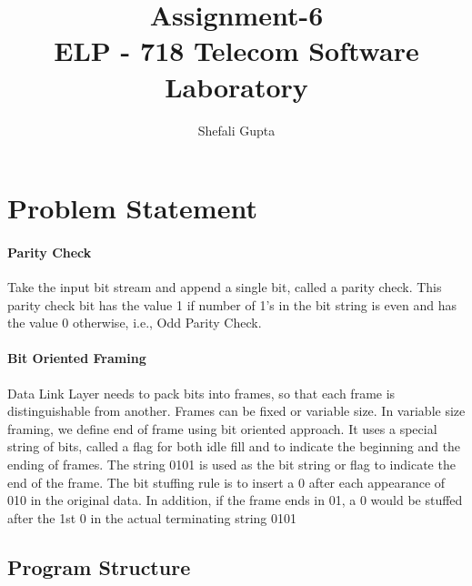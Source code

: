 \documentclass[a4paper,10pt]{report}
\title{\textbf{Assignment-6\\
ELP - 718 Telecom Software Laboratory}}
\author{Shefali Gupta}
\date{\parbox{\linewidth}{\centering%
  \today\endgraf\bigskip
 Entry No. - 2017JTM2767\endgraf\bigskip
  \texttt{[image: /home/shefaligupta/Downloads/iit.png]} \endgraf\bigskip
Bharti School\\
Telecommunication Technology and Management \\ IIT DELHI\\India}}
\begin{document}
\maketitle

\newpage
\tableofcontents
\newpage
{}

\section{Problem Statement}

\paragraph{Parity Check}
Take the input bit stream and append a single bit, called a parity check. This parity check bit has the value 1 if number of 1’s in the bit string is even and has the value 0 otherwise, i.e., Odd Parity Check.

\paragraph{Bit Oriented Framing}

Data Link Layer needs to pack bits into frames, so that each frame is distinguishable from another. Frames can be fixed or variable size. In variable size framing, we define end of frame using bit oriented approach. It uses a special string of bits, called a flag for both idle fill and to indicate the beginning and the ending of frames.
The string 0101 is used as the bit string or flag to indicate the end of the frame. The bit stuffing rule is to insert a 0 after each appearance of 010 in the original data. In addition, if the frame ends in 01, a 0 would be stuffed after the 1st 0 in the actual terminating string 0101


\subsection{Program Structure}
\end{document}
